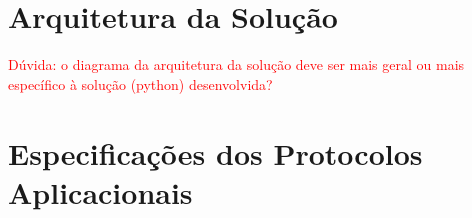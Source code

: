 \documentclass[a4paper,12pt]{scrreprt}
\begin{document}
\pagebreak



\renewcommand{\contentsname}{Índice}
\renewcommand{\listfigurename}{Índice de Figuras}
\renewcommand{\listtablename}{Índice de Tabelas}
\renewcommand{\lstlistlistingname}{Índice de \textit{Snippets}}

\tableofcontents
\pagebreak

\listoffigures
\pagebreak

\listoftables
\pagebreak

\lstlistoflistings
\pagebreak




\chapter{Arquitetura da Solução}

\textcolor{red}{
    Dúvida: o diagrama da arquitetura da solução deve ser
    mais geral ou mais específico à solução (python) desenvolvida?
}



\chapter{Especificações dos Protocolos Aplicacionais}
\end{document}
